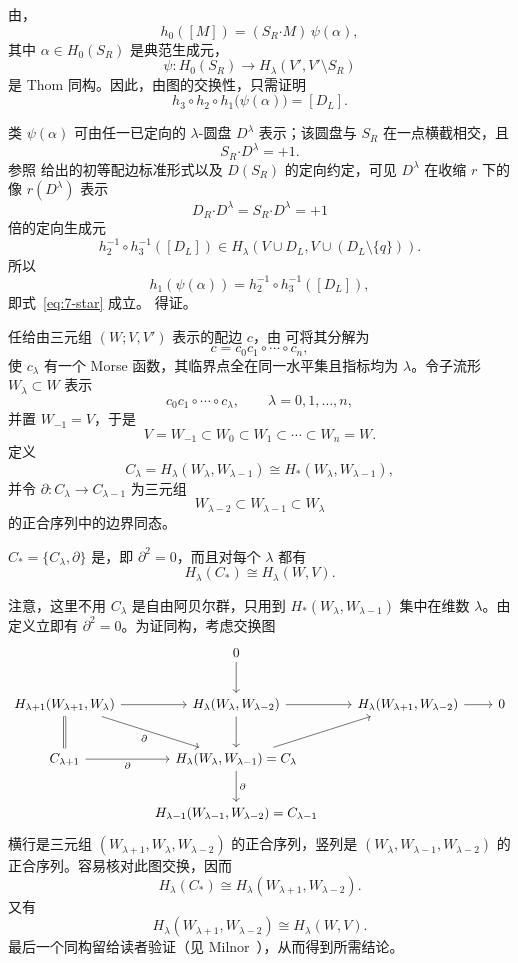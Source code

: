 由，
\[
  h_0([M])=(S_R\mathbin{\boldsymbol\cdot}M)\,\psi(\alpha),
\]
其中 $\alpha\in H_0(S_R)$ 是典范生成元，
\[
  \psi:H_0(S_R)\longrightarrow H_\lambda(V',V'\setminus S_R)
\]
是 Thom 同构。因此，由图的交换性，只需证明
\begin{equation}
  h_3\circ h_2\circ h_1\bigl(\psi(\alpha)\bigr)=[D_L].
  \tag{$*$}\label{eq:7-star}
\end{equation}

类 $\psi(\alpha)$ 可由任一已定向的 $\lambda$-圆盘 $D^\lambda$ 表示；该圆盘与 $S_R$ 在一点横截相交，且
\[
  S_R\mathbin{\boldsymbol\cdot}D^\lambda=+1.
\]
参照 给出的初等配边标准形式以及 $D(S_R)$ 的定向约定，可见 $D^\lambda$ 在收缩 $r$ 下的像 $r(D^\lambda)$ 表示
\[
  D_R\mathbin{\boldsymbol\cdot}D^\lambda
  =S_R\mathbin{\boldsymbol\cdot}D^\lambda=+1
\]
倍的定向生成元
\[
  h_2^{-1}\circ h_3^{-1}([D_L])
  \in H_\lambda(V\cup D_L,V\cup(D_L\setminus\{q\})).
\]
所以
\[
  h_1(\psi(\alpha))=h_2^{-1}\circ h_3^{-1}([D_L]),
\]
即式~\eqref{eq:7-star} 成立。 得证。
\EndProof

任给由三元组 $(W;V,V')$ 表示的配边 $c$，由 可将其分解为
\[
  c=c_0c_1\circ\cdots\circ c_n,
\]
使 $c_\lambda$ 有一个 Morse 函数，其临界点全在同一水平集且指标均为 $\lambda$。令子流形 $W_\lambda\subset W$ 表示
\[
  c_0c_1\circ\cdots\circ c_\lambda,
  \qquad \lambda=0,1,\ldots,n,
\]
并置 $W_{-1}=V$，于是
\[
  V=W_{-1}\subset W_0\subset W_1\subset\cdots\subset W_n=W.
\]
定义
\[
  C_\lambda=H_\lambda(W_\lambda,W_{\lambda-1})
  \cong H_*(W_\lambda,W_{\lambda-1}),
\]
并令 $\partial:C_\lambda\to C_{\lambda-1}$ 为三元组
\[
  W_{\lambda-2}\subset W_{\lambda-1}\subset W_\lambda
\]
的正合序列中的边界同态。

$C_*=\{C_\lambda,\partial\}$ 是，即 $\partial^2=0$，而且对每个 $\lambda$ 都有
\[
  H_\lambda(C_*)\cong H_\lambda(W,V).
\]

\Proof 注意，这里不用 $C_\lambda$ 是自由阿贝尔群，只用到 $H_*(W_\lambda,W_{\lambda-1})$ 集中在维数 $\lambda$。由定义立即有 $\partial^2=0$。为证同构，考虑交换图
\[
\begin{tikzcd}[column sep=2.15em,row sep=2.35em]
  & 0 \arrow[d] & & \\
  H_{\lambda+1}(W_{\lambda+1},W_\lambda)
    \arrow[r] \arrow[d,equal] \arrow[dr,"\partial"']
  & H_\lambda(W_\lambda,W_{\lambda-2})
    \arrow[r] \arrow[d]
  & H_\lambda(W_{\lambda+1},W_{\lambda-2}) \arrow[r]
  & 0 \\
  C_{\lambda+1} \arrow[r,"\partial"']
  & H_\lambda(W_\lambda,W_{\lambda-1})=C_\lambda
    \arrow[ur] \arrow[d,"\partial"] \\
  & H_{\lambda-1}(W_{\lambda-1},W_{\lambda-2})=C_{\lambda-1}
\end{tikzcd}
\]
横行是三元组 $(W_{\lambda+1},W_\lambda,W_{\lambda-2})$ 的正合序列，竖列是 $(W_\lambda,W_{\lambda-1},W_{\lambda-2})$ 的正合序列。容易核对此图交换，因而
\[
  H_\lambda(C_*)\cong H_\lambda(W_{\lambda+1},W_{\lambda-2}).
\]
又有
\[
  H_\lambda(W_{\lambda+1},W_{\lambda-2})\cong H_\lambda(W,V).
\]
最后一个同构留给读者验证（见 Milnor~\cite[p.~9]{ref19}），从而得到所需结论。
\EndProof


